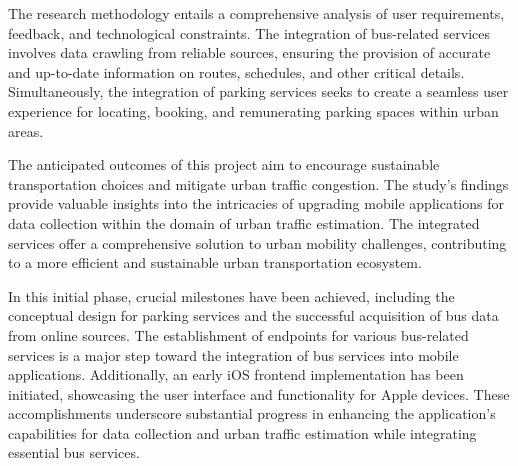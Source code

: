 \documentclass[a4paper]{article}
\begin{document}
The research methodology entails a comprehensive analysis of user requirements, feedback, and technological constraints. The integration of bus-related services involves data crawling from reliable sources, ensuring the provision of accurate and up-to-date information on routes, schedules, and other critical details. Simultaneously, the integration of parking services seeks to create a seamless user experience for locating, booking, and remunerating parking spaces within urban areas.

The anticipated outcomes of this project aim to encourage sustainable transportation choices and mitigate urban traffic congestion. The study's findings provide valuable insights into the intricacies of upgrading mobile applications for data collection within the domain of urban traffic estimation. The integrated services offer a comprehensive solution to urban mobility challenges, contributing to a more efficient and sustainable urban transportation ecosystem.

In this initial phase, crucial milestones have been achieved, including the conceptual design for parking services and the successful acquisition of bus data from online sources. The establishment of endpoints for various bus-related services is a major step toward the integration of bus services into mobile applications. Additionally, an early iOS frontend implementation has been initiated, showcasing the user interface and functionality for Apple devices. These accomplishments underscore substantial progress in enhancing the application's capabilities for data collection and urban traffic estimation while integrating essential bus services.


\newpage
\tableofcontents
\newpage
\listoffigures
\listoftables







\nocite{*}
\printbibliography[heading=bibintoc, title={REFERENCE}]
\end{document}
